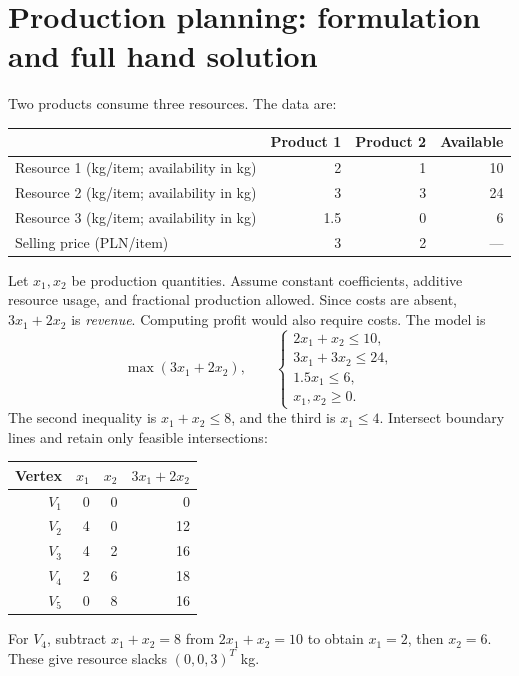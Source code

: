 \documentclass[11pt,a4paper]{article}
\begin{document}
\section{Production planning: formulation and full hand solution}\label{sec:production}
Two products consume three resources. The data are:
\begin{center}
  \begin{tabular}{lrrr}\toprule
    & Product 1 & Product 2 & Available\\\midrule
    Resource 1 (kg/item; availability in kg) & 2 & 1 & 10\\
    Resource 2 (kg/item; availability in kg) & 3 & 3 & 24\\
    Resource 3 (kg/item; availability in kg) & 1.5 & 0 & 6\\
    Selling price (PLN/item) & 3 & 2 & ---\\\bottomrule
  \end{tabular}
\end{center}
Let $x_1,x_2$ be production quantities. Assume constant coefficients, additive
resource usage, and fractional production allowed. Since costs are absent,
$3x_1+2x_2$ is \emph{revenue}. Computing profit would also require costs.
The model is
\begin{equation}\label{eq:production}
  \max (3x_1+2x_2),\qquad
  \begin{cases}
    2x_1+x_2\leq10,  \\
    3x_1+3x_2\leq24, \\
    1.5x_1\leq6,     \\
    x_1,x_2\geq0.
  \end{cases}
\end{equation}
The second inequality is $x_1+x_2\leq8$, and the third is $x_1\leq4$.
Intersect boundary lines and retain only feasible intersections:
\begin{center}
  \begin{tabular}{rrrr}\toprule
    Vertex & $x_1$ & $x_2$ & $3x_1+2x_2$\\\midrule
    $V_1$ & 0 & 0 & 0\\
    $V_2$ & 4 & 0 & 12\\
    $V_3$ & 4 & 2 & 16\\
    $V_4$ & 2 & 6 & 18\\
    $V_5$ & 0 & 8 & 16\\\bottomrule
  \end{tabular}
\end{center}
For $V_4$, subtract $x_1+x_2=8$ from $2x_1+x_2=10$ to obtain $x_1=2$,
then $x_2=6$. These give resource slacks $(0,0,3)^T$ kg.
\end{document}
